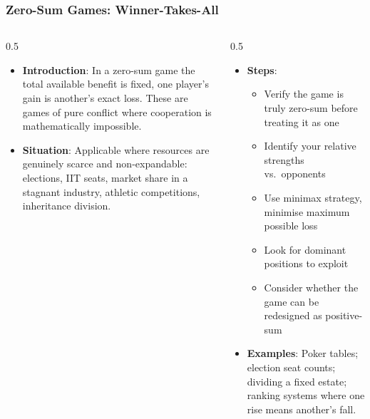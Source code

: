 \begin{frame}[fragile]\frametitle{Zero-Sum Games: Winner-Takes-All}
\begin{columns}
    \begin{column}[T]{0.5\linewidth}
      \begin{itemize}
        \item \textbf{Introduction}: In a zero-sum game the total available benefit is fixed, one player's gain is another's exact loss. These are games of pure conflict where cooperation is mathematically impossible.
        \item \textbf{Situation}: Applicable where resources are genuinely scarce and non-expandable: elections, IIT seats, market share in a stagnant industry, athletic competitions, inheritance division.
      \end{itemize}
    \end{column}
    \begin{column}[T]{0.5\linewidth}
      \begin{itemize}
        \item \textbf{Steps}:
        \begin{itemize}
          \item Verify the game is truly zero-sum before treating it as one
          \item Identify your relative strengths vs.\ opponents
          \item Use minimax strategy, minimise maximum possible loss
          \item Look for dominant positions to exploit
          \item Consider whether the game can be redesigned as positive-sum
        \end{itemize}\item \textbf{Examples}: Poker tables; election seat counts; dividing a fixed estate; ranking systems where one rise means another's fall.
      \end{itemize}
    \end{column}
  \end{columns}
\end{frame}


